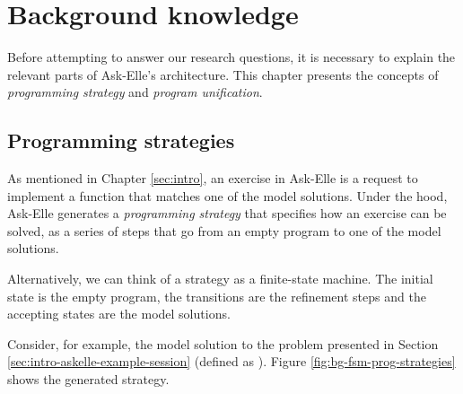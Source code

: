 \chapter{Background knowledge}
\label{sec:background}

Before attempting to answer our research questions, it is necessary to explain the relevant parts of Ask-Elle's architecture. This chapter presents the concepts of \emph{programming strategy} and \emph{program unification}.

\section{Programming strategies}

As mentioned in Chapter \ref{sec:intro}, an exercise in Ask-Elle is a request to implement a function that matches one of the model solutions. Under the hood, Ask-Elle  generates a \emph{programming strategy} that specifies how an exercise can be solved, as a series of steps that go from an empty program to one of the model solutions.

Alternatively, we can think of a strategy as a finite-state machine. The initial state is the empty program, the transitions are the refinement steps and the accepting states are the model solutions.

Consider, for example, the model solution to the problem presented in Section \ref{sec:intro-askelle-example-session} (defined as ). Figure \ref{fig:bg-fsm-prog-strategies} shows the generated strategy.

